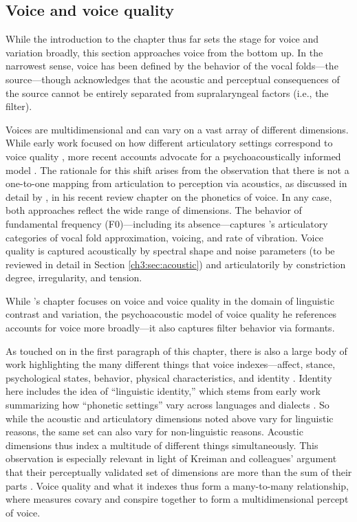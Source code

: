 \subsection{Voice and voice quality}\label{ch3:sec:voicequality}

While the introduction to the chapter thus far sets the stage for voice and variation broadly, this section approaches voice from the bottom up. In the narrowest sense, voice has been defined by the behavior of the vocal folds---the source---though \citet{garellek_2019_voice} acknowledges that the acoustic and perceptual consequences of the source cannot be entirely separated from supralaryngeal factors (i.e., the filter). 

Voices are multidimensional and can vary on a vast array of different dimensions. While early work focused on how different articulatory settings correspond to voice quality \citep{laver_1980_phonetic, pittam_1987_lts}, more recent accounts advocate for a psychoacoustically informed model \citep{kreiman_2014_theory}. The rationale for this shift arises from the observation that there is not a one-to-one mapping from articulation to perception via acoustics, as discussed in detail by \citet{garellek_2019_voice}, in his recent review chapter on the phonetics of voice. In any case, both approaches reflect the wide range of dimensions. The behavior of fundamental frequency (F0)---including its absence---captures \citeauthor{garellek_2019_voice}'s \citeyearpar{garellek_2019_voice} articulatory categories of vocal fold approximation, voicing, and rate of vibration. Voice quality is captured acoustically by spectral shape and noise parameters (to be reviewed in detail in Section \ref{ch3:sec:acoustic}) and articulatorily by constriction degree, irregularity, and tension. 

While \citeauthor{garellek_2019_voice}'s \citeyearpar{garellek_2019_voice} chapter focuses on voice and voice quality in the domain of linguistic contrast and variation, the psychoacoustic model of voice quality he references \citep{kreiman_2014_theory} accounts for voice more broadly---it also captures filter behavior via formants. 

As touched on in the first paragraph of this chapter, there is also a large body of work highlighting the many different things that voice indexes---affect, stance, psychological states, behavior, physical characteristics, and identity \citep{podesva_2015_voice}. Identity here includes the idea of ``linguistic identity,'' which stems from early work summarizing how ``phonetic settings'' vary across languages and dialects \citep[see][]{podesva_2015_voice, pittam_1987_lts,mennen_2010_settings}. So while the acoustic and articulatory dimensions noted above vary for linguistic reasons, the same set can also vary for non-linguistic reasons. Acoustic dimensions thus index a multitude of different things simultaneously. This observation is especially relevant in light of Kreiman and colleagues' argument that their perceptually validated set of dimensions are more than the sum of their parts \citep{kreiman_2014_theory, kreiman_2021_validating}. Voice quality and what it indexes thus form a many-to-many relationship, where measures covary and conspire together to form a multidimensional percept of voice. 

